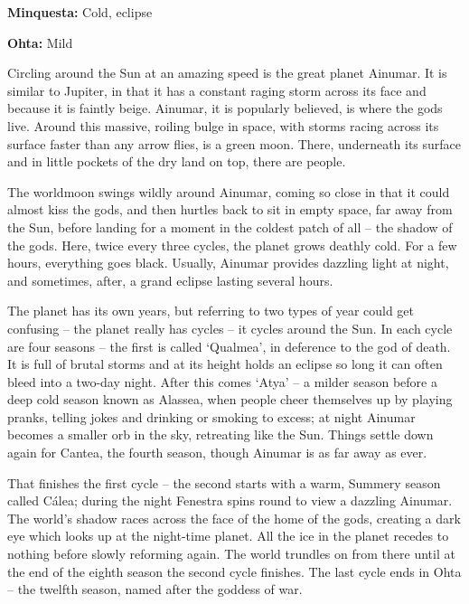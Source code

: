 \begin{multicols}{2}
\begin{tcolorbox}
\begin{list}{\addtocounter{enc}{1} \bf Cycle }{}
\begin{list}{\addtocounter{list}{1}}{}
\item \textbf{Minquesta:}  Cold, eclipse

\item \textbf{Ohta:}  Mild

\end{list}

\end{list}

\end{tcolorbox}

\noindent Circling around the Sun at an amazing speed is the great planet Ainumar.
It is similar to Jupiter, in that it has a constant raging storm across its face and because it is faintly beige.
Ainumar, it is popularly believed, is where the gods live.
Around this massive, roiling bulge in space, with storms racing across its surface faster than any arrow flies, is a green moon.
There, underneath its surface and in little pockets of the dry land on top, there are people.

The worldmoon swings wildly around Ainumar, coming so close in that it could almost kiss the gods, and then hurtles back to sit in empty space, far away from the Sun, before landing for a moment in the coldest patch of all -- the shadow of the gods.
Here, twice every three cycles, the planet grows deathly cold.
For a few hours, everything goes black.
Usually, Ainumar provides dazzling light at night, and sometimes, after, a grand eclipse lasting several hours.

The planet has its own years, but referring to two types of year could get confusing -- the planet really has cycles -- it cycles around the Sun.
In each cycle are four seasons -- the first is called `Qualmea', in deference to the god of death.
It is full of brutal storms and at its height holds an eclipse so long it can often bleed into a two-day night.
After this comes `Atya' -- a milder season before a deep cold season known as Alassea, when people cheer themselves up by playing pranks, telling jokes and drinking or smoking to excess; at night Ainumar becomes a smaller orb in the sky, retreating like the Sun.
Things settle down again for Cantea, the fourth season, though Ainumar is as far away as ever.

That finishes the first cycle -- the second starts with a warm, Summery season called C\'{a}lea; during the night Fenestra spins round to view a dazzling Ainumar.
The world's shadow races across the face of the home of the gods, creating a dark eye which looks up at the night-time planet.
All the ice in the planet recedes to nothing before slowly reforming again.
The world trundles on from there until at the end of the eighth season the second cycle finishes.
 The last cycle ends in Ohta -- the twelfth season, named after the goddess of war.

\end{multicols}

